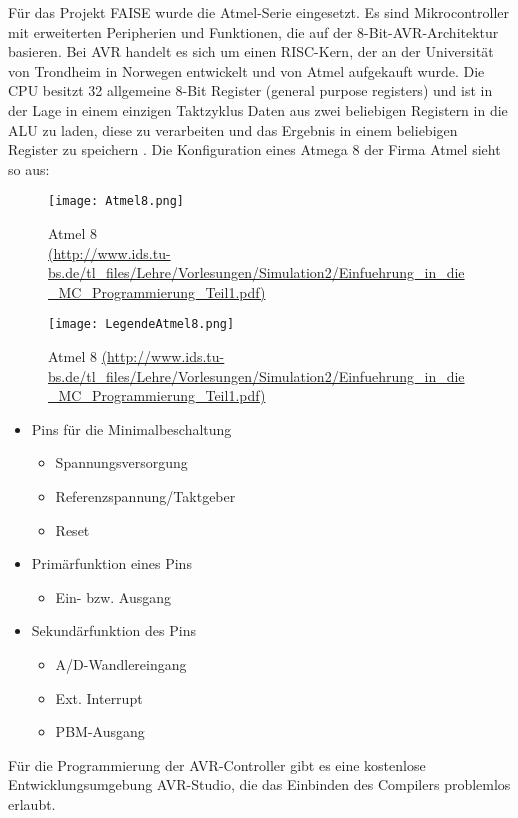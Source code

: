 Für das Projekt FAISE wurde die Atmel-Serie eingesetzt. Es sind Mikrocontroller mit erweiterten Peripherien und Funktionen, 
die auf der 8-Bit-AVR-Architektur basieren. Bei AVR handelt es sich um einen RISC-Kern, der an der Universität von Trondheim 
in Norwegen entwickelt und von Atmel aufgekauft wurde. Die CPU besitzt 32 allgemeine 8-Bit Register (general purpose registers) 
und ist in der Lage in einem einzigen Taktzyklus Daten aus zwei beliebigen Registern in die ALU zu laden, diese zu verarbeiten 
und das Ergebnis in einem beliebigen Register zu speichern \cite[vgl.]{Viktor:Seib:2014:Online}. Die Konfiguration eines Atmega 8 der Firma Atmel sieht so aus:
\begin{figure}[h!]
	\centering
		\texttt{[image: Atmel8.png]}
	\caption{Atmel 8 \\ \url{(http://www.ids.tu-bs.de/tl\_files/Lehre/Vorlesungen/Simulation2/Einfuehrung\_in\_die\_MC\_Programmierung\_Teil1.pdf)}}
	\label{Atmel 8}
\end{figure}
\begin{figure}[h!]
	\centering
		\texttt{[image: LegendeAtmel8.png]}
	\caption{Atmel 8 \url{(http://www.ids.tu-bs.de/tl\_files/Lehre/Vorlesungen/Simulation2/Einfuehrung\_in\_die\_MC\_Programmierung\_Teil1.pdf)}}
	\label{Legende Atmel8}
\end{figure}
\begin{itemize}
\item Pins für die Minimalbeschaltung
\begin{itemize}
          \item Spannungsversorgung
          \item Referenzspannung/Taktgeber
          \item Reset      
					\end{itemize}
\item Primärfunktion eines Pins
\begin{itemize}
          \item Ein- bzw. Ausgang
					\end{itemize}
\item Sekundärfunktion des Pins
\begin{itemize}
          \item A/D-Wandlereingang
          \item Ext. Interrupt
          \item PBM-Ausgang   
\end{itemize}
\end{itemize}
Für die Programmierung der AVR-Controller gibt es eine kostenlose Entwicklungsumgebung AVR-Studio, die das Einbinden des Compilers problemlos erlaubt.

